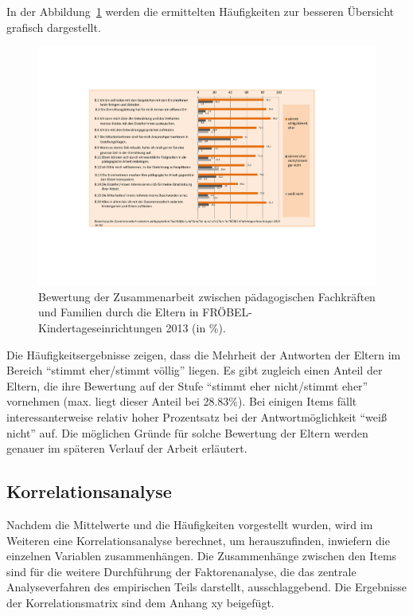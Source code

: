 \documentclass[12pt,a4paper]{article}
\begin{document}
	In der Abbildung~\ref{fig_freq} werden die ermittelten Häufigkeiten zur besseren Übersicht  grafisch dargestellt.

\begin{figure}[h]
\centering
\includegraphics[scale=0.65]{figures/freq_dist3}
\caption{Bewertung der Zusammenarbeit zwischen pädagogischen Fachkräften und Familien durch die Eltern in FRÖBEL-Kindertageseinrichtungen 2013 (in \%).}
\label{fig_freq}
\end{figure}
\FloatBarrier
Die Häufigkeitsergebnisse zeigen, dass die Mehrheit der Antworten der Eltern im Bereich "`stimmt eher/stimmt völlig"' liegen. Es gibt zugleich einen Anteil der Eltern, die ihre Bewertung auf der Stufe "`stimmt eher nicht/stimmt eher"' vornehmen (max. liegt dieser Anteil bei 28.83\%). Bei einigen Items fällt interessanterweise relativ hoher Prozentsatz bei der Antwortmöglichkeit "`weiß nicht"' auf. Die möglichen Gründe für solche Bewertung der Eltern werden genauer im späteren Verlauf der Arbeit erläutert.

\subsection{Korrelationsanalyse}  
Nachdem die Mittelwerte und die Häufigkeiten vorgestellt wurden, wird im Weiteren eine Korrelationsanalyse berechnet, um herauszufinden, inwiefern die einzelnen Variablen zusammenhängen. Die Zusammenhänge zwischen den Items sind für die weitere Durchführung der Faktorenanalyse, die das zentrale Analyseverfahren des empirischen Teils darstellt, ausschlaggebend. Die Ergebnisse der Korrelationsmatrix sind dem Anhang xy beigefügt.
\end{document}
